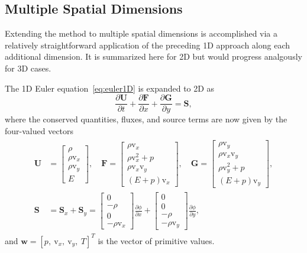 \subsection{Multiple Spatial Dimensions}
\label{subsec:multiDim}

Extending the method to multiple spatial dimensions is accomplished via a relatively straightforward application of the preceding 1D approach along each additional dimension. It is summarized here for 2D but would progress analgously for 3D cases.

The 1D Euler equation~\eqref{eq:euler1D} is expanded to 2D as
\begin{equation} \label{eq:euler2D}
\frac{\partial \mathbf{U}}{\partial t}+\frac{\partial \mathbf{F}}{\partial x}+\frac{\partial \mathbf{G}}{\partial y}=\mathbf{S},
\end{equation}
where the conserved quantities, fluxes, and source terms are now given by the four-valued vectors
\begin{align}
\begin{split}
\mathbf{U}&=
\begin{bmatrix}
\rho \\ \rho \mathrm{v}_x \\ \rho \mathrm{v}_y \\ E
\end{bmatrix}
,\quad \mathbf{F}=
\begin{bmatrix}
\rho \mathrm{v}_x \\ \rho \mathrm{v}_x^2+p \\ \rho \mathrm{v}_x \mathrm{v}_y \\ (E+p)\mathrm{v}_x
\end{bmatrix}
,\quad \mathbf{G}=
\begin{bmatrix}
\rho \mathrm{v}_y \\ \rho \mathrm{v}_x \mathrm{v}_y \\ \rho \mathrm{v}_y^2+p \\ (E+p)\mathrm{v}_y
\end{bmatrix}, \\
\mathbf{S}&=\mathbf{S}_x+\mathbf{S}_y=
\begin{bmatrix}
0 \\ -\rho \\ 0 \\ -\rho \mathrm{v}_x
\end{bmatrix} \frac{\partial \phi}{\partial x} +
\begin{bmatrix}
0 \\ 0 \\ -\rho \\ -\rho \mathrm{v}_y
\end{bmatrix} \frac{\partial \phi}{\partial y},
\end{split}
\end{align}
and $\mathbf{w}=[p,\ \mathrm{v}_x,\  \mathrm{v}_y,\ T]^T$ is the vector of primitive values.

